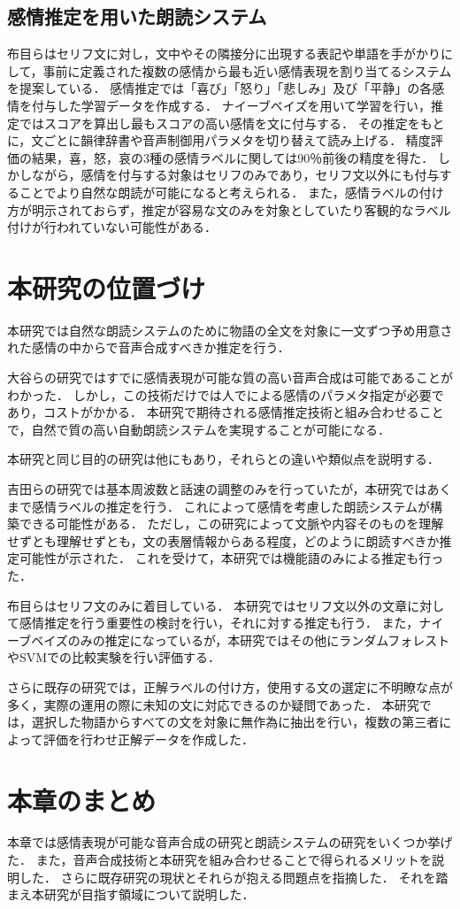 \subsection{感情推定を用いた朗読システム}
布目ら\cite{fume}はセリフ文に対し，文中やその隣接分に出現する表記や単語を手がかりにして，事前に定義された複数の感情から最も近い感情表現を割り当てるシステムを提案している．
感情推定では「喜び」「怒り」「悲しみ」及び「平静」の各感情を付与した学習データを作成する．
ナイーブベイズを用いて学習を行い，推定ではスコアを算出し最もスコアの高い感情を文に付与する．
その推定をもとに，文ごとに韻律辞書や音声制御用パラメタを切り替えて読み上げる．
精度評価の結果，喜，怒，哀の3種の感情ラベルに関しては90％前後の精度を得た．
しかしながら，感情を付与する対象はセリフのみであり，セリフ文以外にも付与することでより自然な朗読が可能になると考えられる．
また，感情ラベルの付け方が明示されておらず，推定が容易な文のみを対象としていたり客観的なラベル付けが行われていない可能性がある．


\section{本研究の位置づけ}
本研究では自然な朗読システムのために物語の全文を対象に一文ずつ予め用意された感情の中からで音声合成すべきか推定を行う．


大谷\cite{otani}らの研究ではすでに感情表現が可能な質の高い音声合成は可能であることがわかった．
しかし，この技術だけでは人でによる感情のパラメタ指定が必要であり，コストがかかる．
本研究で期待される感情推定技術と組み合わせることで，自然で質の高い自動朗読システムを実現することが可能になる．

本研究と同じ目的の研究は他にもあり，それらとの違いや類似点を説明する．


吉田ら\cite{yoshida}の研究では基本周波数と話速の調整のみを行っていたが，本研究ではあくまで感情ラベルの推定を行う．
これによって感情を考慮した朗読システムが構築できる可能性がある．
ただし，この研究によって文脈や内容そのものを理解せずとも理解せずとも，文の表層情報からある程度，どのように朗読すべきか推定可能性が示された．
これを受けて，本研究では機能語のみによる推定も行った．


布目ら\cite{fume}はセリフ文のみに着目している．
本研究ではセリフ文以外の文章に対して感情推定を行う重要性の検討を行い，それに対する推定も行う．
また，ナイーブベイズのみの推定になっているが，本研究ではその他にランダムフォレストやSVMでの比較実験を行い評価する．

さらに既存の研究では，正解ラベルの付け方，使用する文の選定に不明瞭な点が多く，実際の運用の際に未知の文に対応できるのか疑問であった．
本研究では，選択した物語からすべての文を対象に無作為に抽出を行い，複数の第三者によって評価を行わせ正解データを作成した．


\section{本章のまとめ}
本章では感情表現が可能な音声合成の研究と朗読システムの研究をいくつか挙げた．
また，音声合成技術と本研究を組み合わせることで得られるメリットを説明した．
さらに既存研究の現状とそれらが抱える問題点を指摘した．
それを踏まえ本研究が目指す領域について説明した．
